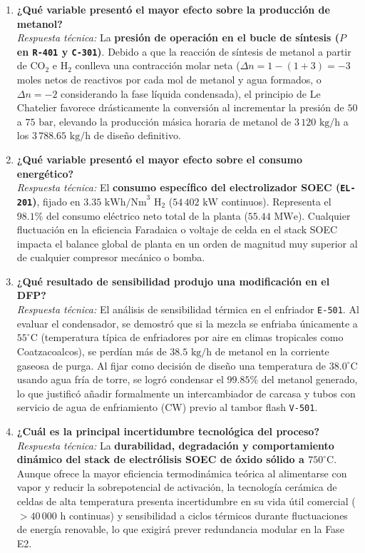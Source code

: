 \documentclass[10pt,letterpaper]{article}
\begin{document}
\begin{enumerate}[leftmargin=*,itemsep=7pt]
    \item \textbf{¿Qué variable presentó el mayor efecto sobre la producción de metanol?}\\
    \textit{Respuesta técnica:} La \textbf{presión de operación en el bucle de síntesis ($P$ en \texttt{R-401} y \texttt{C-301})}. Debido a que la reacción de síntesis de metanol a partir de $\text{CO}_2$ e $\text{H}_2$ conlleva una contracción molar neta ($\Delta n = 1 - (1+3) = -3$ moles netos de reactivos por cada mol de metanol y agua formados, o $\Delta n = -2$ considerando la fase líquida condensada), el principio de Le Chatelier favorece drásticamente la conversión al incrementar la presión de $50$ a $75\text{ bar}$, elevando la producción másica horaria de metanol de $3\,120\text{ kg/h}$ a los $3\,788.65\text{ kg/h}$ de diseño definitivo.

    \item \textbf{¿Qué variable presentó el mayor efecto sobre el consumo energético?}\\
    \textit{Respuesta técnica:} El \textbf{consumo específico del electrolizador SOEC (\texttt{EL-201})}, fijado en $3.35\text{ kWh/Nm}^3\text{ H}_2$ ($54\,402\text{ kW}$ continuos). Representa el $\mathbf{98.1\%}$ del consumo eléctrico neto total de la planta ($55.44\text{ MWe}$). Cualquier fluctuación en la eficiencia Faradaica o voltaje de celda en el stack SOEC impacta el balance global de planta en un orden de magnitud muy superior al de cualquier compresor mecánico o bomba.

    \item \textbf{¿Qué resultado de sensibilidad produjo una modificación en el DFP?}\\
    \textit{Respuesta técnica:} El análisis de sensibilidad térmica en el enfriador \texttt{E-501}. Al evaluar el condensador, se demostró que si la mezcla se enfriaba únicamente a $55^\circ\text{C}$ (temperatura típica de enfriadores por aire en climas tropicales como Coatzacoalcos), se perdían más de $38.5\text{ kg/h}$ de metanol en la corriente gaseosa de purga. Al fijar como decisión de diseño una temperatura de $38.0^\circ\text{C}$ usando agua fría de torre, se logró condensar el $99.85\%$ del metanol generado, lo que justificó añadir formalmente un intercambiador de carcasa y tubos con servicio de agua de enfriamiento (CW) previo al tambor flash \texttt{V-501}.

    \item \textbf{¿Cuál es la principal incertidumbre tecnológica del proceso?}\\
    \textit{Respuesta técnica:} La \textbf{durabilidad, degradación y comportamiento dinámico del stack de electrólisis SOEC de óxido sólido a $750^\circ\text{C}$}. Aunque ofrece la mayor eficiencia termodinámica teórica al alimentarse con vapor y reducir la sobrepotencial de activación, la tecnología cerámica de celdas de alta temperatura presenta incertidumbre en su vida útil comercial ($>40\,000\text{ h}$ continuas) y sensibilidad a ciclos térmicos durante fluctuaciones de energía renovable, lo que exigirá prever redundancia modular en la Fase E2.


\end{enumerate}
\end{document}
